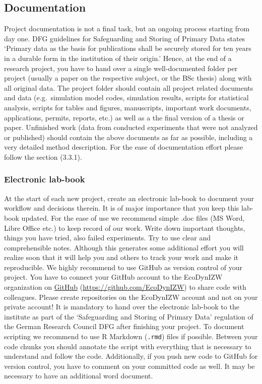 \documentclass[
  english,
]{article}
\begin{document}
\hypertarget{documentation}{%
\subsection{Documentation}\label{documentation}}

Project documentation is not a final task, but an ongoing process
starting from day one. DFG guidelines for Safeguarding and Storing of
Primary Data states `Primary data as the basis for publications shall be
securely stored for ten years in a durable form in the institution of
their origin.' Hence, at the end of a research project, you have to hand
over a single well-documented folder per project (usually a paper on the
respective subject, or the BSc thesis) along with all original data. The
project folder should contain all project related documents and data
(e.g.~simulation model codes, simulation results, scripts for
statistical analysis, scripts for tables and figures, manuscripts,
important work documents, applications, permits, reports, etc.) as well
as a the final version of a thesis or paper. Unfinished work (data from
conducted experiments that were not analyzed or published) should
contain the above documents as far as possible, including a very
detailed method description. For the ease of documentation effort please
follow the section (3.3.1).

\hypertarget{electronic-lab-book}{%
\subsubsection{Electronic lab-book}\label{electronic-lab-book}}

At the start of each new project, create an electronic lab-book to
document your workflow and decisions therein. It is of major importance
that you keep this lab-book updated. For the ease of use we recommend
simple .doc files (MS Word, Libre Office etc.) to keep record of our
work. Write down important thoughts, things you have tried, also failed
experiments. Try to use clear and comprehensible notes. Although this
generates some additional effort you will realize soon that it will help
you and others to track your work and make it reproducible. We highly
recommend to use GitHub as version control of your project. You have to
connect your GitHub account to the EcoDynIZW organization on
\href{https://github.com/EcoDynIZW}{GitHub}
(\url{https://github.com/EcoDynIZW}) to share code with colleagues.
Please create repositories on the EcoDynIZW account and not on your
private account! It is mandatory to hand over the electronic lab-book to
the institute as part of the `Safeguarding and Storing of Primary Data'
regulation of the German Research Council DFG after finishing your
project. To document scripting we recommend to use R Markdown
(\texttt{.rmd}) files if possible. Between your code chunks you should
annotate the script with everything that is necessary to understand and
follow the code. Additionally, if you push new code to GitHub for
version control, you have to comment on your committed code as well. It
may be necessary to have an additional word document.
\end{document}
